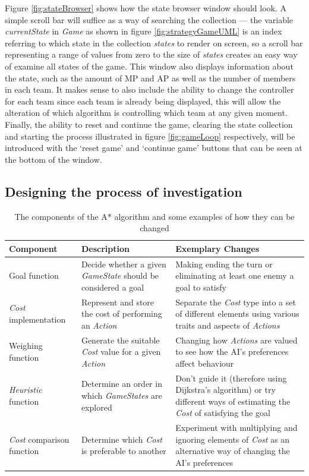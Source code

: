 \documentclass[11pt, a4paper]{report}
\begin{document}
Figure \ref{fig:stateBrowser} shows how the state browser window should look. A simple scroll bar will suffice as a way of searching the collection --- the variable \emph{currentState} in \emph{Game} as shown in figure \ref{fig:strategyGameUML} is an index referring to which state in the collection \emph{states} to render on screen, so a scroll bar representing a range of values from zero to the size of \emph{states} creates an easy way of examine all states of the game. This window also displays information about the state, such as the amount of MP and AP as well as the number of members in each team. It makes sense to also include the ability to change the controller for each team since each team is already being displayed, this will allow the alteration of which algorithm is controlling which team at any given moment. Finally, the ability to reset and continue the game, clearing the state collection and starting the process illustrated in figure \ref{fig:gameLoop} respectively, will be introduced with the `reset game' and `continue game' buttons that can be seen at the bottom of the window. 

\subsection{Designing the process of investigation}
\label{subsec:designingInvestigation process}

\begin{table}[!h]
  \centering
  \begin{tabular}{ | m{2.5cm} | m{4cm} | m{6cm} |}
    \hline
    \textbf{Component} & \textbf{Description} & \textbf{Exemplary Changes} \\ \hline
    Goal function & Decide whether a given \emph{GameState} should be considered a goal & Making ending the turn or eliminating at least one enemy a goal to satisfy \\ \hline
    \emph{Cost} implementation & Represent and store the cost of performing an \emph{Action} & Separate the \emph{Cost} type into a set of different elements using various traits and aspects of \emph{Actions} \\ \hline
    Weighing function & Generate the suitable \emph{Cost} value for a given \emph{Action} & Changing how \emph{Actions} are valued to see how the AI's preferences affect behaviour \\ \hline
    \emph{Heuristic} function & Determine an order in which \emph{GameStates} are explored & Don't guide it (therefore using Dijkstra's algorithm) or try different ways of estimating the \emph{Cost} of satisfying the goal \\ \hline
    \emph{Cost} comparison function & Determine which \emph{Cost} is preferable to another & Experiment with multiplying and ignoring elements of \emph{Cost} as an alternative way of changing the AI's preferences \\
    \hline
  \end{tabular}
  \caption{The components of the A* algorithm and some examples of how they can be changed}
  \label{table:designingAStarVariations}
\end{table}
\end{document}
